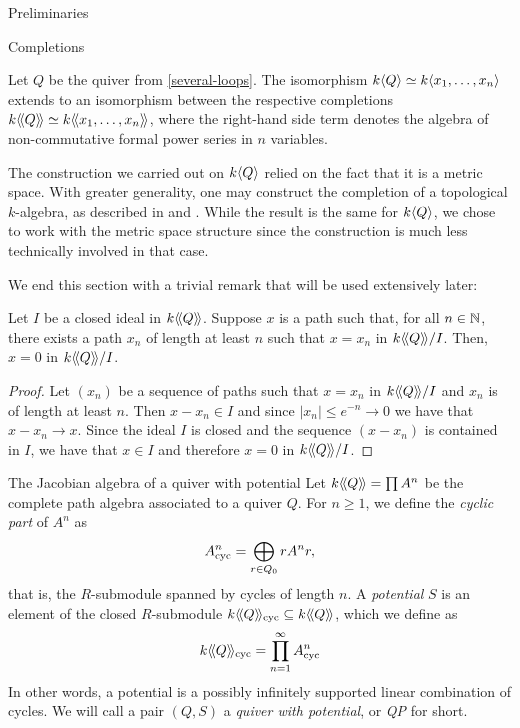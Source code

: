 \begin{chapter}{Preliminaries}
\begin{section}{Completions}
\begin{exmp}Let $Q$ be the quiver from \ref{several-loops}. The isomorphism $k\langle Q\rangle\simeq k\langle x_1,\dots,x_n\rangle$ extends to an isomorphism between the respective completions $k\langle\!\langle Q\rangle\!\rangle\simeq k\langle\!\langle x_1,\dots,x_n\rangle\!\rangle$, where the right-hand side term denotes the algebra of non-commutative formal power series in $n$ variables.
\end{exmp}

The construction we carried out on $k\langle Q\rangle$ relied on the fact that it is a metric space. With greater generality, one may construct the completion of a topological $k$-algebra, as described in \cite{AM69} and \cite{Bou98}. While the result is the same for $k\langle Q\rangle$, we chose to work with the metric space structure since the construction is much less technically involved in that case.

We end this section with a trivial remark that will be used extensively later:

\begin{obs}\label{arbitrarily-long} Let $I$ be a closed ideal in $k\langle\!\langle Q\rangle\!\rangle$. Suppose $x$ is a path such that, for all $n\in \mathbb{N}$, there exists a path $x_n$ of length at least $n$ such that $x=x_n$ in $k\langle\!\langle Q\rangle\!\rangle/I$. Then, $x=0$ in $k\langle\!\langle Q\rangle\!\rangle/I$.
\end{obs}
\begin{proof} Let $(x_n)$ be a sequence of paths such that $x=x_n$ in $k\langle\!\langle Q\rangle\!\rangle/I$ and $x_n$ is of length at least $n$. Then $x-x_n\in I$ and since $|x_n|\leq e^{-n}\to 0$ we have that $x-x_n\to x$. Since the ideal $I$ is closed and the sequence $(x-x_n)$ is contained in $I$, we have that $x\in I$ and therefore $x=0$ in $k\langle\!\langle Q\rangle\!\rangle/I$.
\end{proof}
\end{section}

\begin{section}{The Jacobian algebra of a quiver with potential}
Let $k\langle\!\langle Q\rangle\!\rangle=\prod A^n$ be the complete path algebra associated to a quiver $Q$. For $n\geq 1$, we define the \emph{cyclic part} of $A^n$ as
\[
A^n_{\mathrm{cyc}} = \bigoplus_{r\in Q_0} rA^nr,
\]
that is, the $R$-submodule spanned by cycles of length $n$. A \emph{potential} $S$ is an element of the closed  $R$-submodule $k\langle\!\langle Q\rangle\!\rangle_{\mathrm{cyc}}\subseteq k\langle\!\langle Q\rangle\!\rangle$, which we define as
\[
k\langle\!\langle Q\rangle\!\rangle_{\mathrm{cyc}}=\prod_{n=1}^\infty A^n_{\mathrm{cyc}}
\]
In other words, a potential is a possibly infinitely supported linear combination of cycles. We will call a pair $(Q,S)$ a \emph{quiver with potential}, or \emph{QP} for short.


\end{section}
\end{chapter}
